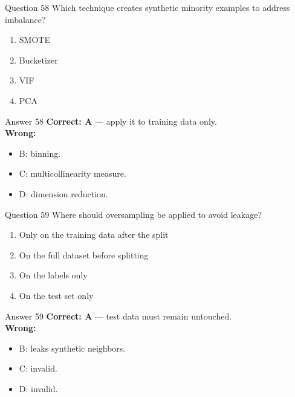 \documentclass[aspectratio=169,11pt]{beamer}
\begin{document}
\begin{frame}{Question 58}
Which technique creates synthetic minority examples to address imbalance?
\begin{enumerate}[label=\Alph*.]
\item SMOTE
\item Bucketizer
\item VIF
\item PCA
\end{enumerate}
\end{frame}
\begin{frame}{Answer 58}
\textbf{Correct: A} --- apply it to training data only.\\
\vspace{0.5em}
\textbf{Wrong:}
\begin{itemize}
\item B: binning.
\item C: multicollinearity measure.
\item D: dimension reduction.
\end{itemize}
\end{frame}

\begin{frame}{Question 59}
Where should oversampling be applied to avoid leakage?
\begin{enumerate}[label=\Alph*.]
\item Only on the training data after the split
\item On the full dataset before splitting
\item On the labels only
\item On the test set only
\end{enumerate}
\end{frame}
\begin{frame}{Answer 59}
\textbf{Correct: A} --- test data must remain untouched.\\
\vspace{0.5em}
\textbf{Wrong:}
\begin{itemize}
\item B: leaks synthetic neighbors.
\item C: invalid.
\item D: invalid.
\end{itemize}
\end{frame}
\end{document}
